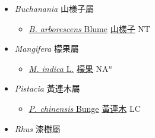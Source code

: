 
  \begin{itemize}
 \item[] \textit{Buchanania} 山檨子屬
                    
  \begin{itemize}
        \item[] \href{http://www.theplantlist.org/tpl1.1/search?q=Buchanania+arborescens}{\textit{B. arborescens} Blume}   \href{\detokenize{http://taibnet.sinica.edu.tw/chi/taibnet_species_list.php?T2=山檨子&T2_new_value=true&fr=y}}{山檨子} NT
  \end{itemize}
 \item[] \textit{Mangifera} 檬果屬
                    
  \begin{itemize}
        \item[] \href{http://www.theplantlist.org/tpl1.1/search?q=Mangifera+indica}{\textit{M. indica} L.}   \href{\detokenize{http://taibnet.sinica.edu.tw/chi/taibnet_species_list.php?T2=檬果&T2_new_value=true&fr=y}}{檬果} NA$^n$
  \end{itemize}
 \item[] \textit{Pistacia} 黃連木屬
                    
  \begin{itemize}
        \item[] \href{http://www.theplantlist.org/tpl1.1/search?q=Pistacia+chinensis}{\textit{P. chinensis} Bunge}   \href{\detokenize{http://taibnet.sinica.edu.tw/chi/taibnet_species_list.php?T2=黃連木&T2_new_value=true&fr=y}}{黃連木} LC
  \end{itemize}
 \item[] \textit{Rhus} 漆樹屬
                    

\end{itemize}
